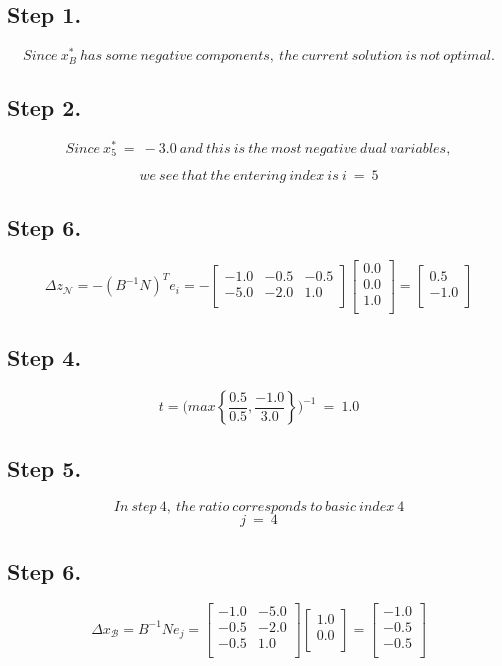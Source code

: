 \documentclass [12pt] {article}
\begin{document}
\subsection{Step 1.}
\[
Since\ x_\mathit{B}^*\ has\ some\ negative\ components,\ the\ current\ solution\ is\ not\ optimal.
\]
\subsection{Step 2.}
\[
Since\ x_5^*\ = \ -3.0\ and\ this\ is\ the\ most\ negative\ dual\ variables,
\]

\[
we\ see\ that\ the\ entering\ index\ is\  i\ =\ 5
\]
\subsection{Step 6.}
\[
\Delta z_{\mathcal N}= -( B^{-1} N )^{T}e_i = -\begin{bmatrix}
-1.0 & -0.5 & -0.5 \\ -5.0 & -2.0 & 1.0 \\ 
\end{bmatrix}
\begin{bmatrix}
0.0 \\ 0.0 \\ 1.0 \\ 
\end{bmatrix}
= \begin{bmatrix}
0.5 \\ -1.0 \\ 
\end{bmatrix}
\]
\subsection{Step 4.}
\[
t =\Bigg(
max \left\{\frac{0.5}{0.5},\frac{-1.0}{3.0}\right\}
\Bigg)^{-1}\ =\ 1.0
\]
\subsection{Step 5.}
\[
In\ step\ 4, \ the\ ratio\ corresponds\ to\ basic\ index\ 4
\]
\[
j\ = \ 4
\]
\subsection{Step 6.}
\[
\Delta x_{\mathcal B} = B^{-1} N e_j =
\begin{bmatrix}
-1.0 & -5.0 \\ -0.5 & -2.0 \\ -0.5 & 1.0 \\ 
\end{bmatrix}
\begin{bmatrix}
1.0 \\ 0.0 \\ 
\end{bmatrix}
= \begin{bmatrix}
-1.0 \\ -0.5 \\ -0.5 \\ 
\end{bmatrix}
\]
\end{document}
